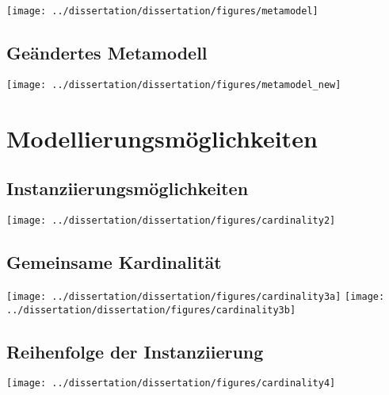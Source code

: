 	\begin{frame}{\insertsectionhead}{\insertsubsectionhead}
		\hfil\texttt{[image: ../dissertation/dissertation/figures/metamodel]}\hfil
	\end{frame}

	\subsection{Geändertes Metamodell}

	\begin{frame}{\insertsectionhead}{\insertsubsectionhead}
		\hfil\texttt{[image: ../dissertation/dissertation/figures/metamodel\_new]}\hfil
	\end{frame}

	\section{Modellierungsmöglichkeiten}

	\subsection{Instanziierungsmöglichkeiten}

	\begin{frame}{\insertsectionhead}{\insertsubsectionhead}
		\hfil\texttt{[image: ../dissertation/dissertation/figures/cardinality2]}\hfil
	\end{frame}

	\subsection{Gemeinsame Kardinalität}

	\begin{frame}{\insertsectionhead}{\insertsubsectionhead}
		\texttt{[image: ../dissertation/dissertation/figures/cardinality3a]}
		\hfill
		\texttt{[image: ../dissertation/dissertation/figures/cardinality3b]}
	\end{frame}

	\subsection{Reihenfolge der Instanziierung}

	\begin{frame}{\insertsectionhead}{\insertsubsectionhead}
		\hfil\texttt{[image: ../dissertation/dissertation/figures/cardinality4]}\hfil
	\end{frame}

